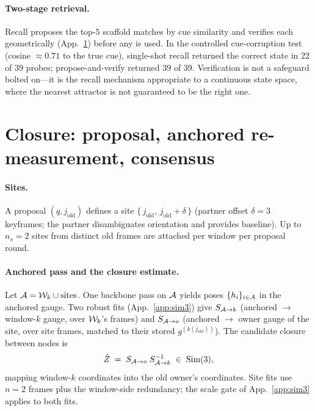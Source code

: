 \paragraph{Two-stage retrieval.}
Recall proposes the top-$5$ scaffold matches by cue similarity and
verifies each geometrically (App.~\ref{app:closure}) before any is
used. In the controlled cue-corruption test (cosine ${\approx}0.71$ to
the true cue), single-shot recall returned the correct state in $22$ of
$39$ probes; propose-and-verify returned $39$ of $39$. Verification is
not a safeguard bolted on---it is the recall mechanism appropriate to a
continuous state space, where the nearest attractor is not guaranteed to
be the right one.

\section{Closure: proposal, anchored re-measurement, consensus}
\label{app:closure}
\paragraph{Sites.}
A proposal $(q, j_{\text{old}})$ defines a site
$\{\,j_{\text{old}},\, j_{\text{old}}{+}\delta\,\}$ (partner offset
$\delta{=}3$ keyframes; the partner disambiguates orientation and provides
baseline). Up to $n_s{=}2$ sites from distinct old frames are attached per
window per proposal round.

\paragraph{Anchored pass and the closure estimate.}
Let $\mathcal{A} = \mathcal{W}_k \cup \text{sites}$. One backbone pass on $\mathcal{A}$ yields
poses $\{h_i\}_{i\in\mathcal{A}}$ in the anchored gauge. Two robust fits
(App.~\ref{app:sim3}) give
$S_{\mathcal{A}\to k}$ (anchored $\to$ window-$k$ gauge, over $\mathcal{W}_k$'s frames) and
$S_{\mathcal{A}\to o}$ (anchored $\to$ owner gauge of the site, over site frames,
matched to their stored $g^{(k(j_{\text{old}}))}$). The candidate closure
between nodes is
\begin{equation}
\hat Z \;=\; S_{\mathcal{A}\to o}\; S_{\mathcal{A}\to k}^{-1}
\;\in\;\mathrm{Sim}(3) ,
\end{equation}
mapping window-$k$ coordinates into the old owner's coordinates. Site fits
use $n{=}2$ frames plus the window-side redundancy; the scale gate of
App.~\ref{app:sim3} applies to both fits.

